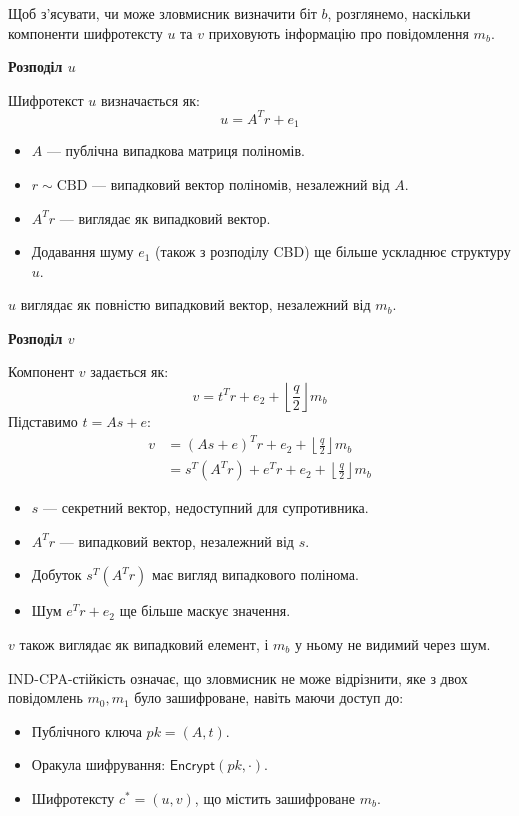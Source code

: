 \newpage
Щоб з'ясувати, чи може зловмисник визначити біт $b$, розглянемо, наскільки компоненти шифротексту $u$ та $v$ приховують інформацію про повідомлення $m_b$.

\textbf{Розподіл $u$}

Шифротекст $u$ визначається як:
\[
u = A^T r + e_1
\]
\begin{itemize}
    \item $A$ --- публічна випадкова матриця поліномів.
    \item $r \sim \text{CBD}$ --- випадковий вектор поліномів, незалежний від $A$.
    \item  $A^T r$ --- виглядає як випадковий вектор.
    \item Додавання шуму $e_1$ (також з розподілу CBD) ще більше ускладнює структуру $u$.
\end{itemize}

$u$ виглядає як повністю випадковий вектор, незалежний від $m_b$.

\textbf{Розподіл $v$}

Компонент $v$ задається як:
\[
v = t^T r + e_2 + \left\lfloor \frac{q}{2} \right\rfloor m_b
\]
Підставимо $t = A s + e$:
\[
\begin{aligned}
v &= (A s + e)^T r + e_2 + \left\lfloor \frac{q}{2} \right\rfloor m_b \\
  &= s^T (A^T r) + e^T r + e_2 + \left\lfloor \frac{q}{2} \right\rfloor m_b
\end{aligned}
\]

\begin{itemize}
    \item $s$ --- секретний вектор, недоступний для супротивника.
    \item $A^T r$ --- випадковий вектор, незалежний від $s$.
    \item Добуток $s^T (A^T r)$ має вигляд випадкового полінома.
    \item Шум $e^T r + e_2$ ще більше маскує значення.
\end{itemize}

$v$ також виглядає як випадковий елемент, і $m_b$ у ньому не видимий через шум.


IND-CPA-стійкість означає, що зловмисник не може відрізнити, яке з двох повідомлень $m_0, m_1$ було зашифроване, навіть маючи доступ до:
\begin{itemize}
    \item Публічного ключа $pk = (A, t)$.
    \item Оракула шифрування: $\mathsf{Encrypt}(pk, \cdot)$.
    \item Шифротексту $c^* = (u, v)$, що містить зашифроване $m_b$.
\end{itemize}

